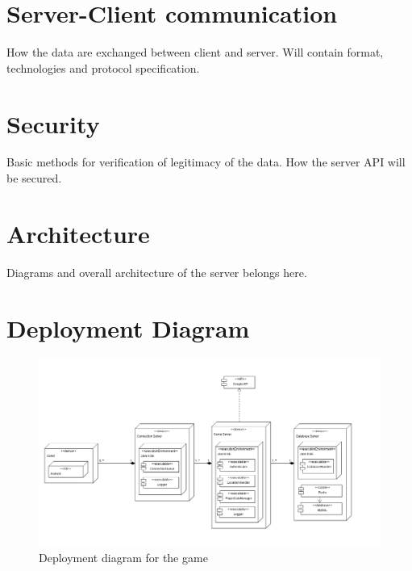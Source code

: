 \section{Server-Client communication}
How the data are exchanged between client and server. Will contain format, technologies and protocol specification. 

\section{Security}
Basic methods for verification of legitimacy of the data. How the server API will be secured.

\section{Architecture}
Diagrams and overall architecture of the server belongs here.

\section{Deployment Diagram}
\begin{figure}[h]	
	\includegraphics[width=\textwidth]{figures/DeploymentDiagram}
	\centering
	\caption{Deployment diagram for the game}
	\label{fig:deploymentdiagram}		
\end{figure}

